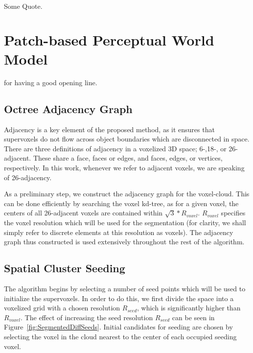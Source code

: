 \begin{savequote}[75mm]
Some Quote.
\end{savequote}


\chapter{Patch-based Perceptual World Model}
\label{Chap:WorldModel}

 for having a good opening line. 
\section{Octree Adjacency Graph}
\label{subsec:Adjacency}
Adjacency is a key element of the proposed method, as it ensures that supervoxels do not flow across object boundaries which are disconnected in space. There are three definitions of adjacency in a voxelized 3D space; 6-,18-, or 26-adjacent. These share a face, faces or edges, and faces, edges, or vertices, respectively. In this work, whenever we refer to adjacent voxels, we are speaking of 26-adjacency. 

As a preliminary step, we construct the adjacency graph for the voxel-cloud. This can be done efficiently by searching the voxel kd-tree, as for a given voxel, the centers of all 26-adjacent voxels are contained within $\sqrt{3}*R_{voxel}$. ${R}_{voxel}$ specifies the voxel resolution which will be used for the segmentation (for clarity, we shall simply refer to discrete elements at this resolution as voxels). The adjacency graph thus constructed is used extensively throughout the rest of the algorithm.

\section{Spatial Cluster Seeding}
\label{subsec:Seeding}
The algorithm begins by selecting a number of seed points which will be used to initialize the supervoxels. In order to do this, we first divide the space into a voxelized grid with a chosen resolution ${R}_{seed}$, which is significantly higher than ${R}_{voxel}$. The effect of increasing the seed resolution ${R}_{seed}$ can be seen in Figure~\ref{fig:SegmentedDiffSeeds}. Initial candidates for seeding are chosen by selecting the voxel in the cloud nearest to the center of each occupied seeding voxel.    




